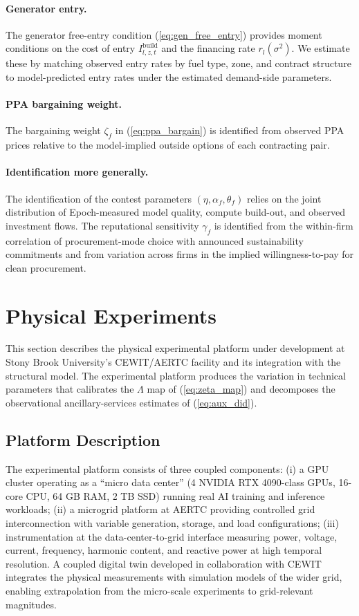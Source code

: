 \documentclass[12pt,letterpaper]{article}
\begin{document}
\paragraph{Generator entry.} The generator free-entry condition
(\ref{eq:gen_free_entry}) provides moment conditions on the cost of
entry $I^{\text{build}}_{l,z,t}$ and the financing rate $r_l(\sigma^2)$.
We estimate these by matching observed entry rates by fuel type, zone,
and contract structure to model-predicted entry rates under the
estimated demand-side parameters.

\paragraph{PPA bargaining weight.} The bargaining weight $\zeta_f$ in
(\ref{eq:ppa_bargain}) is identified from observed PPA prices relative to
the model-implied outside options of each contracting pair.

\paragraph{Identification more generally.} The identification of the
contest parameters $(\eta, \alpha_f, \theta_f)$ relies on the joint
distribution of Epoch-measured model quality, compute build-out, and
observed investment flows. The reputational sensitivity $\gamma_f$ is
identified from the within-firm correlation of procurement-mode choice
with announced sustainability commitments and from variation across firms
in the implied willingness-to-pay for clean procurement.

\section{Physical Experiments}
\label{sec:experiments}

This section describes the physical experimental platform under
development at Stony Brook University's CEWIT/AERTC facility and its
integration with the structural model. The experimental platform produces
the variation in technical parameters that calibrates the $\Lambda$ map of
(\ref{eq:zeta_map}) and decomposes the observational ancillary-services
estimates of (\ref{eq:aux_did}).

\subsection{Platform Description}

The experimental platform consists of three coupled components: (i) a
GPU cluster operating as a ``micro data center'' (4 NVIDIA RTX
4090-class GPUs, 16-core CPU, 64 GB RAM, 2 TB SSD) running real AI
training and inference workloads; (ii) a microgrid platform at AERTC
providing controlled grid interconnection with variable generation,
storage, and load configurations; (iii) instrumentation at the
data-center-to-grid interface measuring power, voltage, current,
frequency, harmonic content, and reactive power at high temporal
resolution. A coupled digital twin developed in collaboration with
CEWIT integrates the physical measurements with simulation models of
the wider grid, enabling extrapolation from the micro-scale experiments
to grid-relevant magnitudes.
\end{document}
